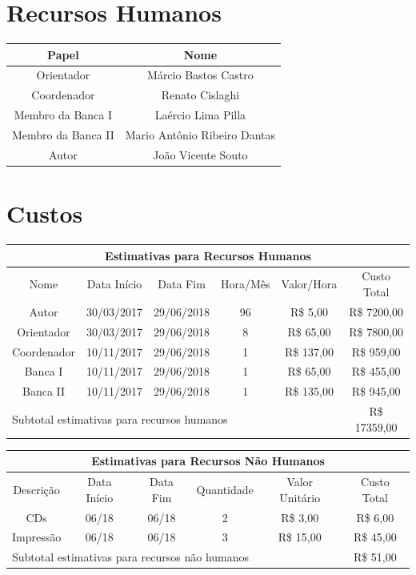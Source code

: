 \documentclass[
	12pt,				%
	openright,			%
	twoside,			%
	a4paper,			%
	english,			%
	brazil,				%
	]{abntex2}
\begin{document}
\section{Recursos Humanos}

\begin{center}
\begin{tabular}{|c|c|}
\hline
    Papel & Nome \\ \hline
    Orientador & Márcio Bastos Castro \\ \hline
    Coordenador & Renato Cislaghi \\ \hline
    Membro da Banca I & Laércio Lima Pilla \\ \hline
    Membro da Banca II &  Mario Antônio Ribeiro Dantas\\ \hline
    Autor & João Vicente Souto \\ \hline
\end{tabular}
\end{center}

\section{Custos}

\begin{center}
\begin{tabular}{|c|c|c|c|c|c|}
\hline
\multicolumn{6}{|c|}{Estimativas para Recursos Humanos} \\ \hline
    Nome & Data Início & Data Fim & Hora/Mês & Valor/Hora & Custo Total \\ \hline
    Autor & 30/03/2017 & 29/06/2018 &  96 & R\$ 5,00 & R\$ 7200,00 \\ \hline
    Orientador & 30/03/2017 & 29/06/2018 & 8 & R\$ 65,00 & R\$ 7800,00 \\ \hline
    Coordenador & 10/11/2017 & 29/06/2018 & 1 & R\$ 137,00 & R\$ 959,00 \\ \hline
    Banca I & 10/11/2017 & 29/06/2018 & 1 & R\$ 65,00 & R\$ 455,00 \\ \hline
    Banca II & 10/11/2017 & 29/06/2018 & 1 & R\$ 135,00 & R\$ 945,00 \\ \hline
\multicolumn{5}{|l|}{Subtotal estimativas para recursos humanos} & R\$ 17359,00 \\
\hline
\end{tabular}
\end{center}

\begin{center}
\begin{tabular}{|c|c|c|c|c|c|}
\hline
\multicolumn{6}{|c|}{Estimativas para Recursos Não Humanos} \\ \hline
    Descrição & Data Início & Data Fim & Quantidade & Valor Unitário & Custo Total \\
    \hline
    CDs & 06/18 & 06/18 & 2 & R\$ 3,00 & R\$ 6,00 \\ \hline
    Impressão & 06/18 & 06/18 & 3 & R\$ 15,00 & R\$ 45,00 \\ \hline
\multicolumn{5}{|l|}{Subtotal estimativas para recursos não humanos} & R\$ 51,00 \\
\hline
\end{tabular}
\end{center}
\end{document}

